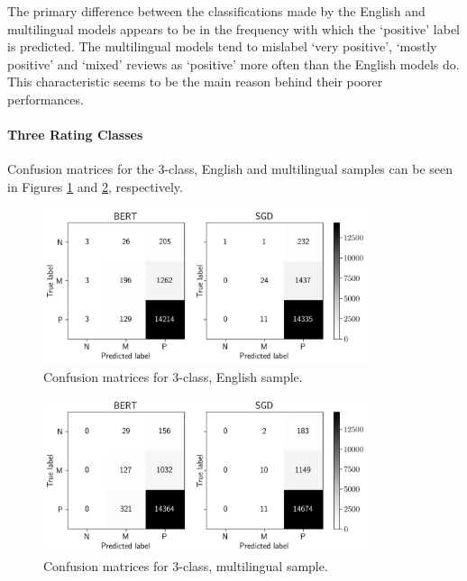 The primary difference between the classifications made by the English and multilingual models appears to be in the frequency with which the `positive' label is predicted. The multilingual models tend to mislabel `very positive', `mostly positive' and `mixed' reviews as `positive' more often than the English models do. This characteristic seems to be the main reason behind their poorer performances.

\paragraph{Three Rating Classes}

Confusion matrices for the 3-class, English and multilingual samples can be seen in Figures \ref{fig:Res_PU_CM_E3} and \ref{fig:Res_PU_CM_M3}, respectively.

\begin{figure}[ht]
    \centering
    \includegraphics[width=0.85\textwidth]{figures/06_results/02_pu/01_cm/eng_3.png}
    \caption{Confusion matrices for 3-class, English sample.}
    \label{fig:Res_PU_CM_E3}
\end{figure}

\begin{figure}[ht]
    \centering
    \includegraphics[width=0.85\textwidth]{figures/06_results/02_pu/01_cm/any_3.png}
    \caption{Confusion matrices for 3-class, multilingual sample.}
    \label{fig:Res_PU_CM_M3}
\end{figure}

